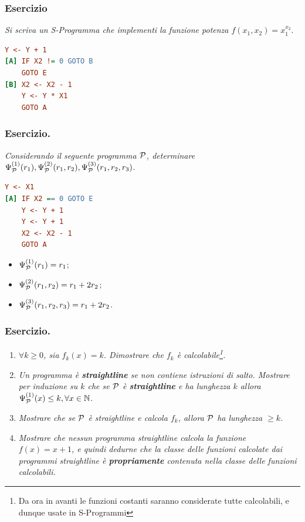 \subsubsection*{Esercizio} \textit{Si scriva un S-Programma che implementi la funzione potenza \(f(x_1,x_2)=x_1^{x_2}\)}.

\begin{lstlisting}[language=ini, label={Funzione Potenza},  caption=Funzione potenza]
    Y <- Y + 1
[A] IF X2 != 0 GOTO B
    GOTO E
[B] X2 <- X2 - 1
    Y <- Y * X1
    GOTO A
\end{lstlisting}

\subsubsection*{Esercizio.} \textit{Considerando il seguente programma \(\mathcal{P}\), determinare \(\Psi_{\mathcal{P}}^{(1)}(r_1), \Psi_{\mathcal{P}}^{(2)}(r_1,r_2), \Psi_{\mathcal{P}}^{(3)}(r_1,r_2,r_3)\)}.

\begin{lstlisting}[language=ini, label={Programma P},  caption=Programma P]
    Y <- X1
[A] IF X2 == 0 GOTO E
    Y <- Y + 1
    Y <- Y + 1
    X2 <- X2 - 1
    GOTO A
\end{lstlisting}

\begin{itemize}
    \item \(\Psi_{\mathcal{P}}^{(1)}(r_1)=r_1\);
    \item \(\Psi_{\mathcal{P}}^{(2)}(r_1,r_2)=r_1+2r_2\);
    \item \(\Psi_{\mathcal{P}}^{(3)}(r_1,r_2,r_3)=r_1+2r_2\).
\end{itemize}

\newpage
\subsubsection*{Esercizio.}

\begin{enumerate}
    \item \textit{\(\forall k\geq0\), sia \(f_k(x)=k\). Dimostrare che \(f_k\) è calcolabile\footnote{Da ora in avanti le funzioni costanti saranno considerate tutte calcolabili, e dunque usate in S-Programmi}.}

    \item \textit{Un programma è \textbf{straightline} se non contiene istruzioni di salto. Mostrare per induzione su \(k\) che se \(\mathcal{P}\) è \textbf{straightline} e ha lunghezza \(k\) allora \(\Psi_{\mathcal{P}}^{(1)}(x)\leq k, \forall x \in \mathbb{N}\).}

    \item \textit{Mostrare che se \(\mathcal{P}\) è straightline e calcola \(f_k\), allora \(\mathcal{P}\) ha lunghezza \(\geq k\).}

    \item \textit{Mostrare che nessun programma straightline calcola la funzione \(f(x)=x+1\), e quindi dedurne che la classe delle funzioni calcolate dai programmi straightline è \textbf{propriamente} contenuta nella classe delle funzioni calcolabili.}
\end{enumerate}

